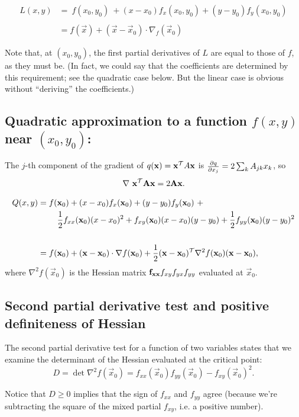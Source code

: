 \begin{align*}
L(x, y) &=
~
f(x_0, y_0) ~+
(x - x_0)f_x(x_0,y_0) +
(y - y_0)f_y(x_0,y_0)
\\\\
&= f(\vec x) + (\vec x - \vec x_0) \cdot \nabla_f(\vec x_0)
\end{align*}

Note that, at $(x_0, y_0)$, the first partial derivatives of $L$ are equal to
those of $f$, as they must be. (In fact, we could say that the coefficients are
determined by this requirement; see the quadratic case below. But the linear
case is obvious without ``deriving'' the coefficients.)


\subsection{Quadratic approximation to a function $f(x, y)$ near $(x_0, y_0)$:}

The $j$-th component of the gradient of $q(\mathbf x) = \mathbf x^\mathcal T A \mathbf x$ is
$\frac{\partial q}{\partial x_j} = 2\sum_k A_{jk}x_k$, so
\begin{align*}
  \nabla ~\mathbf x^\mathcal T \mathbf A \mathbf x = 2\mathbf A \mathbf x.
\end{align*}

\begin{align*}
Q(x, y) &=
f(\mathbf x_0) + (x - x_0)f_x(\mathbf x_0) +
(y - y_0)f_y(\mathbf x_0) ~+ \\
&~~~~~~~\frac{1}{2} f_{xx}(\mathbf x_0)(x - x_0)^2 +
f_{xy}(\mathbf x_0)(x - x_0)(y - y_0) +
\frac{1}{2} f_{yy}(\mathbf x_0)(y - y_0)^2 \\\\
&= f(\mathbf x_0) +
(\mathbf x - \mathbf x_0) \cdot \nabla f(\mathbf x_0) +
\frac{1}{2}(\mathbf x - \mathbf x_0)^\mathcal T \nabla^2 f(\mathbf x_0)(\mathbf x - \mathbf x_0),
\end{align*}
where $\nabla^2 f(\vec x_0)$ is the Hessian matrix $\mathbf{f_{xx}}{f_{xy}}
{f_{yx}}{f_{yy}}$ evaluated at $\vec x_0$.

\subsection{Second partial derivative test and positive definiteness of Hessian}

The second partial derivative test for a function of two variables states that
we examine the determinant of the Hessian evaluated at the critical point:
$$
D = \det \nabla^2 f(\vec x_0) = f_{xx}(\vec x_0)f_{yy}(\vec x_0) - f_{xy}(\vec x_0)^2.
$$

Notice that $D \geq 0$ implies that the sign of $f_{xx}$ and $f_{yy}$ agree
(because we're subtracting the square of the mixed partial $f_{xy}$, i.e. a
positive number).

